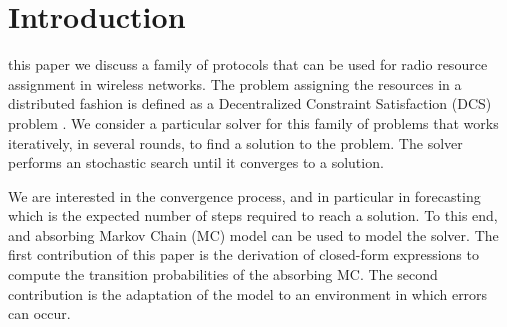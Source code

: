 \documentclass[journal]{IEEEtran}
\begin{document}
\section{Introduction}
% 
% 
% 
% 
 this paper we discuss a family of protocols that can be used for radio resource assignment in wireless networks.
The problem assigning the resources in a distributed fashion is defined as a Decentralized Constraint Satisfaction (DCS) problem \cite{duffy2011dcs}.
We consider a particular solver for this family of problems that works iteratively, in several rounds, to find a solution to the problem.
The solver performs an stochastic search until it converges to a solution.

We are interested in the convergence process, and in particular in forecasting which is the expected number of steps required to reach a solution.
To this end, and absorbing Markov Chain (MC) model can be used to model the solver.
The first contribution of this paper is the derivation of closed-form expressions to compute the transition probabilities of the absorbing MC.
The second contribution is the adaptation of the model to an environment in which errors can occur.
\end{document}
